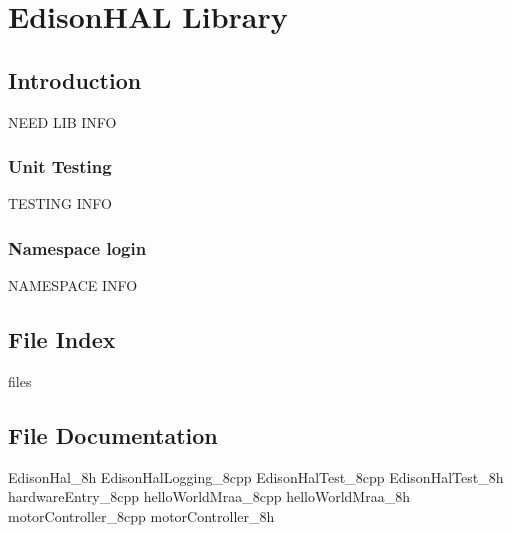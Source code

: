 \part{EdisonHAL Library} \label{sec:edisonhal}

	\chapter{Introduction}

	NEED LIB INFO

		\section{Unit Testing} \label{sec:unit-testing}
		TESTING INFO
		
		\section{Namespace login} \label{sec:Namespace}
		NAMESPACE INFO
		
		\renewcommand{\DOXYGENFOLDER}{../../EdisonHAL/Documentation/doxygenFiles/latex/}

	\chapter{File Index}
		{files}
	
	\chapter{File Documentation}
	
		{EdisonHal_8h}
		{EdisonHalLogging_8cpp}
		{EdisonHalTest_8cpp}
		{EdisonHalTest_8h}
		{hardwareEntry_8cpp}
		{helloWorldMraa_8cpp}
		{helloWorldMraa_8h}
		{motorController_8cpp}
		{motorController_8h}